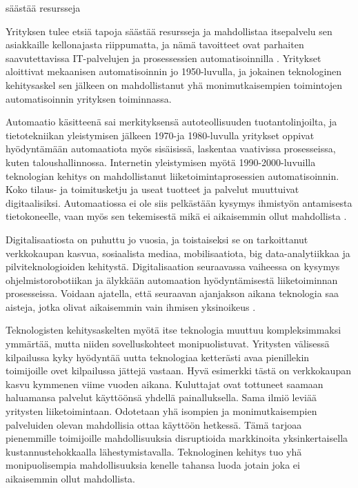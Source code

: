\documentclass[finnish,12pt,a4paper,pdftex]{article}
\begin{document}
säästää resursseja

Yrityksen tulee etsiä tapoja säästää resursseja ja mahdollistaa itsepalvelu sen asiakkaille kellonajasta riippumatta, ja nämä tavoitteet ovat parhaiten saavutettavissa IT-palvelujen ja prosessessien automatisoinnilla \citep{lamoureux}. Yritykset aloittivat mekaanisen automatisoinnin jo 1950-luvulla, ja jokainen teknologinen kehitysaskel sen jälkeen on mahdollistanut yhä monimutkaisempien toimintojen automatisoinnin yrityksen toiminnassa. 

Automaatio käsitteenä sai merkityksensä autoteollisuuden tuotantolinjoilta, ja tietotekniikan yleistymisen jälkeen 1970-ja 1980-luvulla yritykset oppivat hyödyntämään automaatiota myös sisäisissä, laskentaa vaativissa prosesseissa, kuten taloushallinnossa. Internetin yleistymisen myötä 1990-2000-luvuilla teknologian kehitys on mahdollistanut liiketoimintaprosessien automatisoinnin. Koko tilaus- ja toimitusketju ja useat tuotteet ja palvelut muuttuivat digitaalisiksi. Automaatiossa ei ole siis pelkästään kysymys ihmistyön antamisesta tietokoneelle, vaan myös sen tekemisestä mikä ei aikaisemmin ollut mahdollista \citep{groover}.

Digitalisaatiosta on puhuttu jo vuosia, ja toistaiseksi se on tarkoittanut verkkokaupan kasvua, sosiaalista mediaa, mobilisaatiota, big data-analytiikkaa ja pilviteknologioiden kehitystä. Digitalisaation seuraavassa vaiheessa on kysymys ohjelmistorobotiikan ja älykkään automaation hyödyntämisestä liiketoiminnan prosesseissa. Voidaan ajatella, että seuraavan ajanjakson aikana teknologia saa aisteja, jotka olivat aikaisemmin vain ihmisen yksinoikeus \citep{groover}.

Teknologisten kehitysaskelten myötä itse teknologia muuttuu kompleksimmaksi ymmärtää, mutta niiden sovelluskohteet monipuolistuvat. Yritysten välisessä kilpailussa kyky hyödyntää uutta teknologiaa ketterästi avaa pienillekin toimijoille ovet kilpailussa jättejä vastaan. Hyvä esimerkki tästä on verkkokaupan kasvu kymmenen viime vuoden aikana. Kuluttajat ovat tottuneet saamaan haluamansa palvelut käyttöönsä yhdellä painalluksella. Sama ilmiö leviää yritysten liiketoimintaan. Odotetaan yhä isompien ja monimutkaisempien palveluiden olevan mahdollisia ottaa käyttöön hetkessä. Tämä tarjoaa pienemmille toimijoille mahdollisuuksia disruptioida markkinoita yksinkertaisella kustannustehokkaalla lähestymistavalla. Teknologinen kehitys tuo yhä monipuolisempia mahdollisuuksia kenelle tahansa luoda jotain joka ei aikaisemmin ollut mahdollista. \citep{lamoureux}
\end{document}
